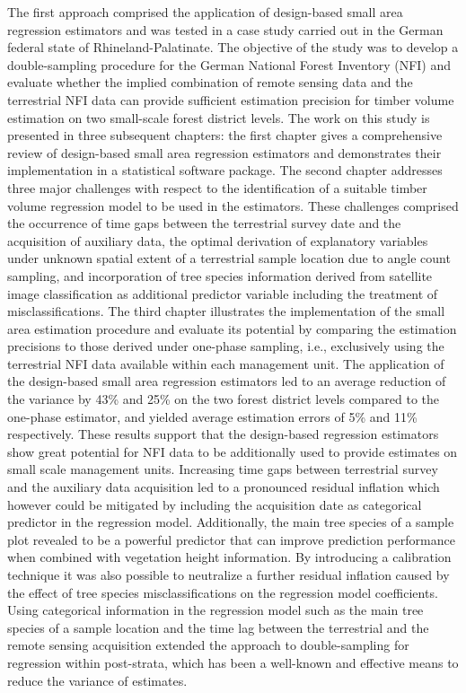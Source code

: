 The first approach comprised the application of design-based small area regression estimators and was tested in a case study carried out in the German federal state of Rhineland-Palatinate. The objective of the study was to develop a double-sampling procedure for the German National Forest Inventory (NFI) and evaluate whether the implied combination of remote sensing data and the terrestrial NFI data can provide sufficient estimation precision for timber volume estimation on two small-scale forest district levels. The work on this study is presented in three subsequent chapters: the first chapter gives a comprehensive review of design-based small area regression estimators and demonstrates their implementation in a statistical software package. The second chapter addresses three major challenges with respect to the identification of a suitable timber volume regression model to be used in the estimators. These challenges comprised the occurrence of time gaps between the terrestrial survey date and the acquisition of auxiliary data, the optimal derivation of explanatory variables under unknown spatial extent of a terrestrial sample location due to angle count sampling, and incorporation of tree species information derived from satellite image classification as additional predictor variable including the treatment of misclassifications. The third chapter illustrates the implementation of the small area estimation procedure and evaluate its potential by comparing the estimation precisions to those derived under one-phase sampling, i.e., exclusively using the terrestrial NFI data available within each management unit. The application of the design-based small area regression estimators led to an average reduction of the variance by 43\% and 25\% on the two forest district levels compared to the one-phase estimator, and yielded average estimation errors of 5\% and 11\% respectively. These results support that the design-based regression estimators show great potential for NFI data to be additionally used to provide estimates on small scale management units. Increasing time gaps between terrestrial survey and the auxiliary data acquisition led to a pronounced residual inflation which however could be mitigated by including the acquisition date as categorical predictor in the regression model. Additionally, the main tree species of a sample plot revealed to be a powerful predictor that can improve prediction performance when combined with vegetation height information. By introducing a calibration technique it was also possible to neutralize a further residual inflation caused by the effect of tree species misclassifications on the regression model coefficients. Using categorical information in the regression model such as the main tree species of a sample location and the time lag between the terrestrial and the remote sensing acquisition extended the approach to double-sampling for regression within post-strata, which has been a well-known and effective means to reduce the variance of estimates.\par

